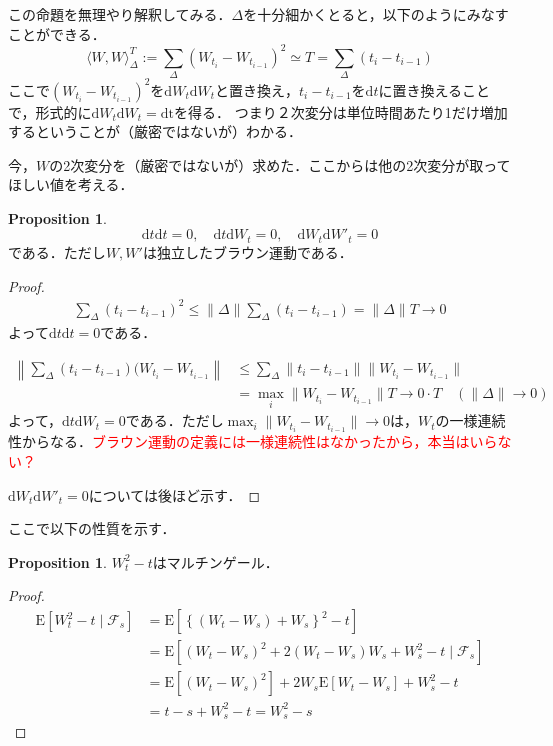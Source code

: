 \documentclass{jsarticle}
\theoremstyle{definition}
\newtheorem{prop}[dfn]{Proposition}
\begin{document}
この命題を無理やり解釈してみる．$\Delta$を十分細かくとると，以下のようにみなすことができる．
\begin{equation*}
    \langle W, W\rangle_{\Delta}^T := \sum_{\Delta}\left(W_{t_i} - W_{t_{i-1}}\right)^2 \simeq T = \sum_{\Delta} (t_i - t_{i-1})
\end{equation*}
ここで$(W_{t_i} - W_{t_{i-1}})^2$を$\mathrm{d}W_t\mathrm{d}W_t$と置き換え，$t_i - t_{i-1}$を$\mathrm{d}t$に置き換えることで，形式的に$\mathrm{d}W_t\mathrm{d}W_t = \mathrm{dt}$を得る．
つまり２次変分は単位時間あたり1だけ増加するということが（厳密ではないが）わかる．

今，$W$の2次変分を（厳密ではないが）求めた．ここからは他の2次変分が取ってほしい値を考える．
\begin{prop}\label{prop:nijihenbun_all}
    $$\mathrm{d}t\mathrm{d}t = 0,\quad \mathrm{d}t\mathrm{d}W_t = 0,\quad \mathrm{d}W_t\mathrm{d}W'_t = 0$$
    である．ただし$W, W'$は独立したブラウン運動である．
\end{prop}
\begin{proof}
    \begin{align*}
        \sum_{\Delta}(t_i - t_{i-1})^2 \leq \|\Delta\| \sum_{\Delta}(t_i - t_{i-1}) = \|\Delta\|T\rightarrow 0
    \end{align*}
    よって$\mathrm{d}t\mathrm{d}t = 0$である．
    
    \begin{align*}
        \left\|\sum_{\Delta}(t_i - t_{i-1})(W_{t_i} - W_{t_{i-1}}\right\| &\leq \sum_{\Delta}\|t_i - t_{i-1}\|\|W_{t_i} - W_{t_{i-1}}\|\\
        &= \max_{i} \|W_{t_i} - W_{t_{i-1}}\| T \rightarrow 0 \cdot T\quad (\|\Delta\| \rightarrow 0)
    \end{align*}
    よって，$\mathrm{d}t\mathrm{d}W_t = 0$である．ただし$\max_{i}\|W_{t_i} - W_{t_{i-1}}\| \rightarrow 0$は，$W_t$の一様連続性からなる．\textcolor{red}{ブラウン運動の定義には一様連続性はなかったから，本当はいらない？}

    $\mathrm{d}W_t\mathrm{d}W'_t = 0$については後ほど示す．
\end{proof}

ここで以下の性質を示す．

\begin{prop}
    $W_t^2 - t$はマルチンゲール．
\end{prop}
\begin{proof}
    \begin{align*}
        \mathrm{E}\left[W_t^2 - t \mid \mathscr{F}_s\right] &= \mathrm{E}\left[\left\{(W_t - W_s) + W_s\right\}^2 - t\right]\\
        &= \mathrm{E}\left[(W_t - W_s)^2 + 2(W_t - W_s)W_s + W_s^2 - t \mid \mathscr{F}_s\right]\\
        &= \mathrm{E}\left[(W_t - W_s)^2\right] + 2W_s\mathrm{E}\left[W_t - W_s\right] + W_s^2 - t\\
        &= t - s + W_s^2 - t = W_s^2 - s
    \end{align*}
\end{proof}
\end{document}
